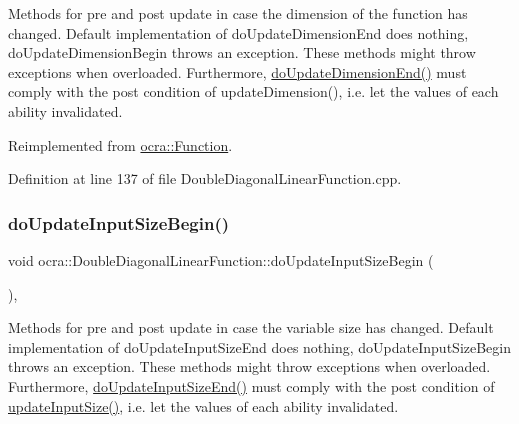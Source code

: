 Methods for pre and post update in case the dimension of the function has changed. Default implementation of do\+Update\+Dimension\+End does nothing, do\+Update\+Dimension\+Begin throws an exception. These methods might throw exceptions when overloaded. Furthermore, {\ttfamily \hyperlink{classocra_1_1Function_a17aa280f0e6eff4a7569edc373a5147d}{do\+Update\+Dimension\+End()}} must comply with the post condition of {\ttfamily update\+Dimension()}, i.\+e. let the values of each ability invalidated. 

Reimplemented from \hyperlink{classocra_1_1Function_afdf98e9f43fde97a5256af88a50cbb39}{ocra\+::\+Function}.



Definition at line 137 of file Double\+Diagonal\+Linear\+Function.\+cpp.

\hypertarget{classocra_1_1DoubleDiagonalLinearFunction_a91fd529bf34bffd327fcd545035bec67}{}\label{classocra_1_1DoubleDiagonalLinearFunction_a91fd529bf34bffd327fcd545035bec67} 
\subsubsection{\texorpdfstring{do\+Update\+Input\+Size\+Begin()}{doUpdateInputSizeBegin()}}
{\footnotesize\ttfamily void ocra\+::\+Double\+Diagonal\+Linear\+Function\+::do\+Update\+Input\+Size\+Begin (\begin{DoxyParamCaption}{ }\end{DoxyParamCaption})\hspace{0.3cm}{\ttfamily [protected]}, {\ttfamily [virtual]}}

Methods for pre and post update in case the variable size has changed. Default implementation of do\+Update\+Input\+Size\+End does nothing, do\+Update\+Input\+Size\+Begin throws an exception. These methods might throw exceptions when overloaded. Furthermore, {\ttfamily \hyperlink{classocra_1_1DoubleDiagonalLinearFunction_a89070f8f2b068d8b6b3e216433e50538}{do\+Update\+Input\+Size\+End()}} must comply with the post condition of {\ttfamily \hyperlink{classocra_1_1Function_a3a5b9e6ae296339acc87ab2cbf97ef98}{update\+Input\+Size()}}, i.\+e. let the values of each ability invalidated. 

